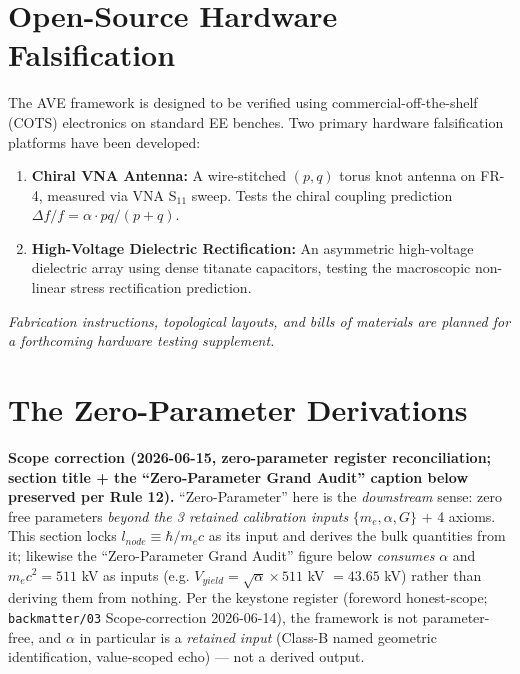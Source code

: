 \section{Open-Source Hardware Falsification}
\label{sec:ee_bench}

The AVE framework is designed to be verified using commercial-off-the-shelf (COTS) electronics on standard EE benches. Two primary hardware falsification platforms have been developed:

\begin{enumerate}
    \item \textbf{Chiral VNA Antenna:} A wire-stitched $(p,q)$ torus knot antenna on FR-4, measured via VNA S$_{11}$ sweep. Tests the chiral coupling prediction $\Delta f/f = \alpha \cdot pq/(p+q)$.
    \item \textbf{High-Voltage Dielectric Rectification:} An asymmetric high-voltage dielectric array using dense titanate capacitors, testing the macroscopic non-linear stress rectification prediction.
\end{enumerate}

\textit{Fabrication instructions, topological layouts, and bills of materials are planned for a forthcoming hardware testing supplement.}


\section{The Zero-Parameter Derivations}
\noindent\textbf{Scope correction (2026-06-15, zero-parameter register reconciliation; section title + the ``Zero-Parameter Grand Audit'' caption below preserved per Rule 12).} ``Zero-Parameter'' here is the \emph{downstream} sense: zero free parameters \emph{beyond the 3 retained calibration inputs} $\{m_e, \alpha, G\}$ $+$ 4 axioms. This section locks $l_{node} \equiv \hbar/m_e c$ as its input and derives the bulk quantities from it; likewise the ``Zero-Parameter Grand Audit'' figure below \emph{consumes} $\alpha$ and $m_e c^2 = 511$ kV as inputs (e.g. $V_{yield} = \sqrt{\alpha}\times 511$ kV $= 43.65$ kV) rather than deriving them from nothing. Per the keystone register (foreword honest-scope; \texttt{backmatter/03} Scope-correction 2026-06-14), the framework is not parameter-free, and $\alpha$ in particular is a \emph{retained input} (Class-B named geometric identification, value-scoped echo) --- not a derived output.

